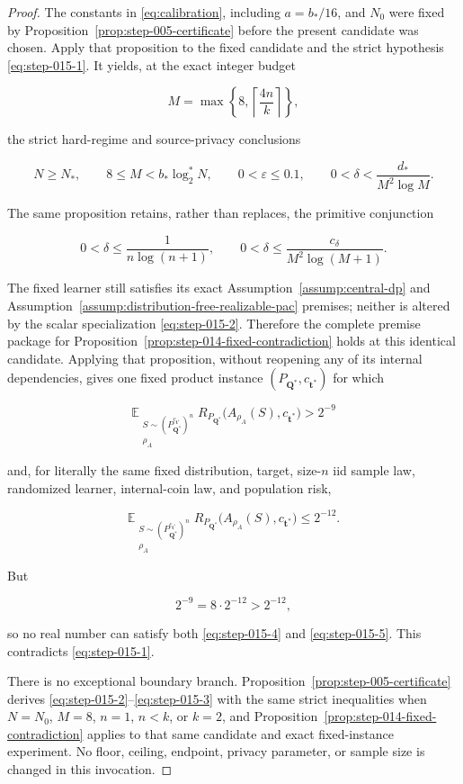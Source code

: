 \begin{proof}
The constants in \eqref{eq:calibration}, including \(a=b_*/16\), and
\(N_0\) were fixed by
Proposition~\ref{prop:step-005-certificate} before the present
candidate was chosen. Apply that proposition to the fixed candidate and the
strict hypothesis \eqref{eq:step-015-1}. It yields, at the exact integer budget

\[
M=\max\left\{8,\left\lceil\frac{4n}{k}\right\rceil\right\},
\]

the strict hard-regime and source-privacy conclusions

\[
N\ge N_*,\qquad 8\le M<b_*\log_2^*N,
\qquad 0<\varepsilon\le0.1,
\qquad 0<\delta<\frac{d_*}{M^2\log M}.
\tag{S15.2}\label{eq:step-015-2}
\]

The same proposition retains, rather than replaces, the primitive
conjunction

\[
0<\delta\le\frac{1}{n\log(n+1)},
\qquad
0<\delta\le\frac{c_\delta}{M^2\log(M+1)}.
\tag{S15.3}\label{eq:step-015-3}
\]

The fixed learner still satisfies its exact
Assumption~\ref{assump:central-dp} and
Assumption~\ref{assump:distribution-free-realizable-pac} premises; neither
is altered by the scalar specialization \eqref{eq:step-015-2}. Therefore the complete
premise package for
Proposition~\ref{prop:step-014-fixed-contradiction} holds at this identical
candidate. Applying that proposition, without reopening any of its internal
dependencies, gives one fixed product instance
\((P_{\boldsymbol Q^*},c_{\boldsymbol t^*})\) for which

\[
\mathbb E_{\substack{
 S\sim(P_{\boldsymbol Q^*}^{c_{\boldsymbol t^*}})^n\\
 \rho_A}}
R_{P_{\boldsymbol Q^*}}
\bigl(A_{\rho_A}(S),c_{\boldsymbol t^*}\bigr)>2^{-9}
\tag{S15.4}\label{eq:step-015-4}
\]

and, for literally the same fixed distribution, target, size-\(n\) iid
sample law, randomized learner, internal-coin law, and population risk,

\[
\mathbb E_{\substack{
 S\sim(P_{\boldsymbol Q^*}^{c_{\boldsymbol t^*}})^n\\
 \rho_A}}
R_{P_{\boldsymbol Q^*}}
\bigl(A_{\rho_A}(S),c_{\boldsymbol t^*}\bigr)\le2^{-12}.
\tag{S15.5}\label{eq:step-015-5}
\]

But

\[
2^{-9}=8\cdot2^{-12}>2^{-12},
\tag{S15.6}\label{eq:step-015-6}
\]

so no real number can satisfy both \eqref{eq:step-015-4} and \eqref{eq:step-015-5}. This contradicts \eqref{eq:step-015-1}.

There is no exceptional boundary branch. Proposition~\ref{prop:step-005-certificate} derives \eqref{eq:step-015-2}--\eqref{eq:step-015-3} with the same
strict inequalities when \(N=N_0\), \(M=8\), \(n=1\), \(n<k\), or
\(k=2\), and Proposition~\ref{prop:step-014-fixed-contradiction} applies to that same
candidate and exact fixed-instance experiment. No floor, ceiling, endpoint,
privacy parameter, or sample size is changed in this invocation. \end{proof}

